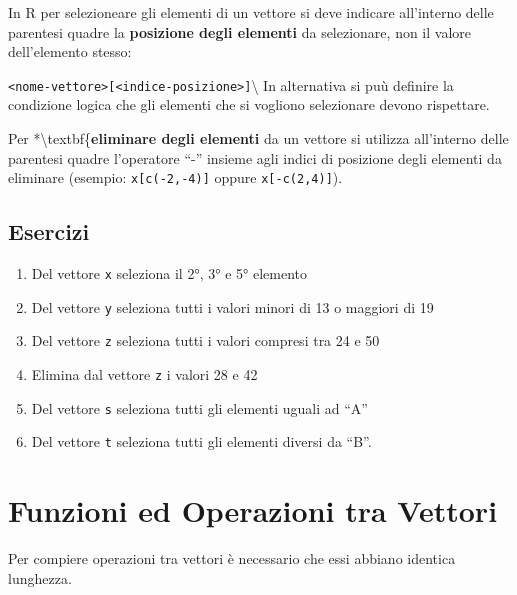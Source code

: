 \documentclass[
]{book}
\providecommand{\tightlist}{%
  \setlength{\itemsep}{0pt}\setlength{\parskip}{0pt}}
\begin{document}
In R per selezioneare gli elementi di un vettore si deve indicare all'interno delle parentesi quadre la \textbf{posizione degli elementi} da selezionare, non il valore dell'elemento stesso:

\texttt{\textless{}nome-vettore\textgreater{}{[}\textless{}indice-posizione\textgreater{}{]}}\textbackslash{}
In alternativa si puù definire la condizione logica che gli elementi che si vogliono selezionare devono rispettare.

Per *\textbackslash textbf\{\textbf{eliminare degli elementi} da un vettore si utilizza all'interno delle parentesi quadre l'operatore ``-'' insieme agli indici di posizione degli elementi da eliminare (esempio: \texttt{x{[}c(-2,-4){]}} oppure \texttt{x{[}-c(2,4){]}}).

\hypertarget{esercizi-3}{%
\subsection*{Esercizi}\label{esercizi-3}}

\begin{enumerate}
\def\labelenumi{\arabic{enumi}.}
\tightlist
\item
  Del vettore \texttt{x} seleziona il 2°, 3° e 5° elemento
\item
  Del vettore \texttt{y} seleziona tutti i valori minori di 13 o maggiori di 19
\item
  Del vettore \texttt{z} seleziona tutti i valori compresi tra 24 e 50
\item
  Elimina dal vettore \texttt{z} i valori 28 e 42
\item
  Del vettore \texttt{s} seleziona tutti gli elementi uguali ad ``A''
\item
  Del vettore \texttt{t} seleziona tutti gli elementi diversi da ``B''.
\end{enumerate}

\hypertarget{funzioni-ed-operazioni-tra-vettori}{%
\section{Funzioni ed Operazioni tra Vettori}\label{funzioni-ed-operazioni-tra-vettori}}

Per compiere operazioni tra vettori è necessario che essi abbiano identica lunghezza.
\end{document}
